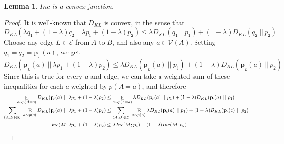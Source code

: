 \documentclass{article}
\theoremstyle{plain}
\newtheorem{lemma}[theorem]{Lemma}
\theoremstyle{definition}
\theoremstyle{remark}
\DeclareMathOperator{\E}{\mathrm{E}} %
\newcommand\mat[1]{\mathbf{#1}}
\newcommand{\bp}[1][L]{\mat{p}_{\!_{#1}\!}}
\newcommand{\Ed}{\mathcal E}
\newcommand\inconsist{\mathit{Inc}}
\numberwithin{equation}{section}
\begin{document}
	
	\begin{lemma}
		\label{thm:inc-convex}
		$\inconsist$ is a convex function. %
	\end{lemma}
	\begin{proof}
		It is well-known that $D_{KL}$ is convex, in the sense that 
		\[ D_{KL}(\lambda q_1 + (1-\lambda) q_2 \ ||\ \lambda p_1 + (1-\lambda) p_2) \leq \lambda D_{KL} (q_1\ ||\ p_1) + (1-\lambda) D_{KL}(q_2\ ||\ p_2) \]
		Choose any edge $L \in \Ed$ from $A$ to $B$, and also any $a \in \mathcal V(A)$. 
		Setting $q_1 = q_2 = \bp(a)$, we get
		\[ D_{KL}(\bp(a) \ ||\ \lambda p_1 + (1-\lambda) p_2) \leq \lambda D_{KL} (\bp(a) \ ||\ p_1) + (1-\lambda) D_{KL}(\bp(a)\ ||\ p_2) \]
		Since this is true for every $a$ and edge, we can take a weighted sum of these inequalities for each $a$ weighted by $p(A=a)$, and therefore
		\begin{align*}
			\E_{a\sim p(A=a)} D_{KL}(\bp(a) \ ||\ \lambda p_1 + (1-\lambda) p_2) &\leq \E_{a\sim p(A=a)}\lambda D_{KL} (\bp(a) \ ||\ p_1) + (1-\lambda) D_{KL}(\bp(a)\ ||\ p_2) \\
			\sum_{(A, B) \in \cal L}~\E_{a\sim p(a)} D_{KL}(\bp(a) \ ||\ \lambda p_1 + (1-\lambda) p_2) &\leq \sum_{(A, B) \in \cal L}~\E_{a\sim p(A)}\lambda D_{KL} (\bp(a) \ ||\ p_1) + (1-\lambda) D_{KL}(\bp(a)\ ||\ p_2) \\
			\inconsist(M ; \lambda p_1 + (1-\lambda)p_2) &\leq \lambda \inconsist(M;p_1) + (1-\lambda) \inconsist(M;p_2)
		\end{align*}
	\end{proof}
\end{document}
